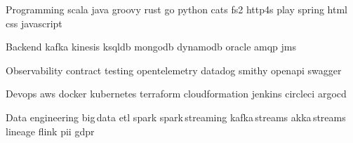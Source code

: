 
\begin{cvskills}

    \cvskill
    {Programming}
    {scala {} java {} groovy {} rust {} go {} python {} cats {} fs2 {} http4s {} play {} spring {} html {} css {} javascript}

    \cvskill
    {Backend}
    {kafka {} kinesis {} ksqldb {} mongodb {} dynamodb {} oracle {} amqp {} jms}

    \cvskill
    {Observability}
    {contract testing {} opentelemetry {} datadog {} smithy {} openapi {} swagger}

    \cvskill
    {Devops}
    {aws {} docker {} kubernetes {} terraform {} cloudformation {} jenkins {} circleci {} argocd}

    \cvskill
    {Data engineering}
    {big\,data {} etl {} spark {} spark\,streaming {} kafka\,streams {} akka\,streams {} lineage {} flink {} pii {} gdpr}

%

\end{cvskills}
